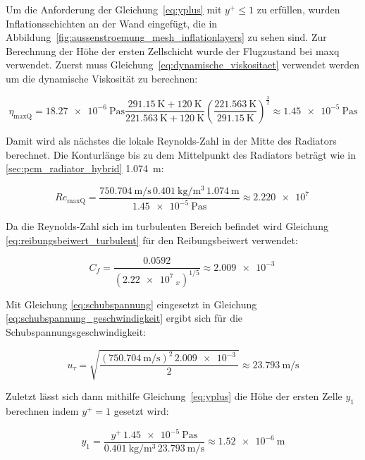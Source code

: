 Um die Anforderung der Gleichung~\ref{eq:yplus} mit $y^+ \leq 1$ zu erfüllen, wurden Inflationsschichten an der Wand eingefügt, die in Abbildung~\ref{fig:aussenstroemung_mesh_inflationlayers}
zu sehen sind. Zur Berechnung der Höhe der ersten Zellschicht wurde der Flugzustand bei \ac{maxq} verwendet.
Zuerst muss Gleichung~\ref{eq:dynamische_viskositaet} verwendet werden um die dynamische Viskosität zu berechnen:

\begin{equation*}
  \eta_\mathrm{max Q} = \SI{18,27e-6}{\pascal\second} \frac{\SI{291,15}{\kelvin} + \SI{120}{\kelvin}}{\SI{221,563}{\kelvin} + \SI{120}{\kelvin}} {\left( \frac{\SI{221,563}{\kelvin}}{\SI{291,15}{\kelvin}} \right)}^{\frac{3}{2}} \approx \SI{1,45e-5}{\pascal\second}
\end{equation*}

Damit wird als nächstes die lokale Reynolds-Zahl in der Mitte des Radiators berechnet. Die Konturlänge bis zu dem Mittelpunkt des Radiators beträgt wie in \ref{sec:pcm_radiator_hybrid} \SI{1,074}{\meter}:

\begin{equation*}
  Re_{\mathrm{maxQ}} = \frac{\SI{750,704}{\meter\per\second}\,\SI{0,401}{\kilogram\per\meter\cubed}\,\SI{1,074}{\meter}}{\SI{1,45e-5}{\pascal\second}} \approx \SI{2,220e7}{}
\end{equation*}

Da die Reynolds-Zahl sich im turbulenten Bereich befindet wird Gleichung \ref{eq:reibungsbeiwert_turbulent} für den Reibungsbeiwert verwendet:

\begin{equation*}
  C_f = \frac{0.0592}{\left({\SI{2,22e7}{}}_x\right)^{1/5}} \approx \SI{2,009e-3}{}
\end{equation*}

Mit Gleichung \ref{eq:schubspannung} eingesetzt in Gleichung \ref{eq:schubspannung_geschwindigkeit} ergibt sich für die Schubspannungsgeschwindigkeit:

\begin{equation*}
  u_{\tau} = \sqrt{\frac{\left(\SI{750,704}{\meter\per\second}\right)^2\,\SI{2,009e-3}{}}{2}} \approx \SI{23,793}{\meter\per\second}
\end{equation*}

Zuletzt lässt sich dann mithilfe Gleichung~\ref{eq:yplus} die Höhe der ersten Zelle $y_1$ berechnen indem $y^+ = 1$ gesetzt wird:

\begin{equation*}
  y_1 = \frac{y^+\,\SI{1,45e-5}{\pascal\second}}{\SI{0,401}{\kilogram\per\meter\cubed}\,\SI{23,793}{\meter\per\second}} \approx \SI{1,52e-6}{\meter}
\end{equation*}

